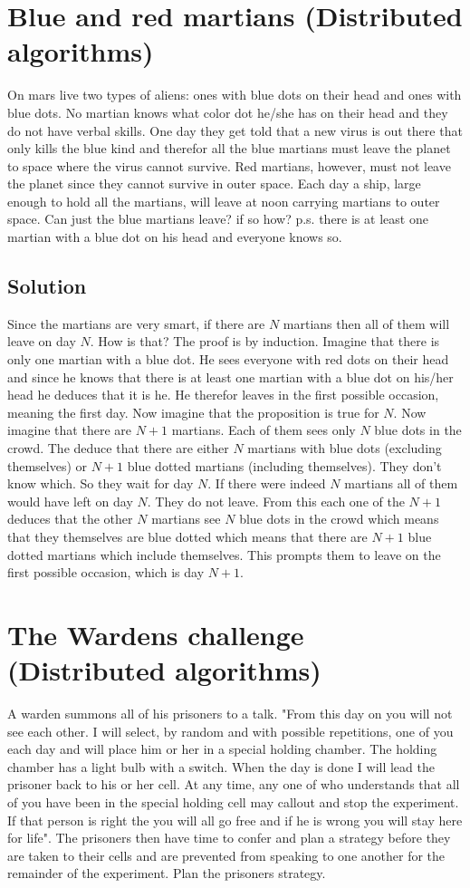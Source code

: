 \documentclass{article}
\begin{document}
\section{Blue and red martians (Distributed algorithms)}
On mars live two types of aliens: ones with blue dots on their head and ones with blue dots. No martian knows what color dot he/she has on their head and they do not have verbal skills. One day they get told that a new virus is out there that only kills the blue kind and therefor all the blue martians must leave the planet to space where the virus cannot survive. Red martians, however, must not leave the planet since they cannot survive in outer space. Each day a ship, large enough to hold all the martians, will leave at noon carrying martians to outer space. Can just the blue martians leave? if so how? p.s. there is at least one martian with a blue dot on his head and everyone knows so.

\subsection{Solution}
Since the martians are very smart, if there are $N$ martians then all of them will leave on day $N$. How is that? The proof is by induction. Imagine that there is only one martian with a blue dot. He sees everyone with red dots on their head and since he knows that there is at least one martian with a blue dot on his/her head he deduces that it is he. He therefor leaves in the first possible occasion, meaning the first day. Now imagine that the proposition is true for $N$. Now imagine that there are $N+1$ martians. Each of them sees only $N$ blue dots in the crowd. The deduce that there are either $N$ martians with blue dots (excluding themselves) or $N+1$ blue dotted martians (including themselves). They don't know which. So they wait for day $N$. If there were indeed $N$ martians all of them would have left on day $N$. They do not leave. From this each one of the $N+1$ deduces that the other $N$ martians see $N$ blue dots in the crowd which means that they themselves are blue dotted which means that there are $N+1$ blue dotted martians which include themselves. This prompts them to leave on the first possible occasion, which is day $N+1$.

\section{The Wardens challenge (Distributed algorithms)}
A warden summons all of his prisoners to a talk. "From this day on you will not see each other. I will select, by random and with possible repetitions, one of you each day and will place him or her in a special holding chamber. The holding chamber has a light bulb with a switch. When the day is done I will lead the prisoner back to his or her cell. At any time, any one of who understands that all of you have been in the special holding cell may callout and stop the experiment. If that person is right the you will all go free and if he is wrong you will stay here for life". The prisoners then have time to confer and plan a strategy before they are taken to their cells and are prevented from speaking to one another for the remainder of the experiment. Plan the prisoners strategy.
\end{document}
